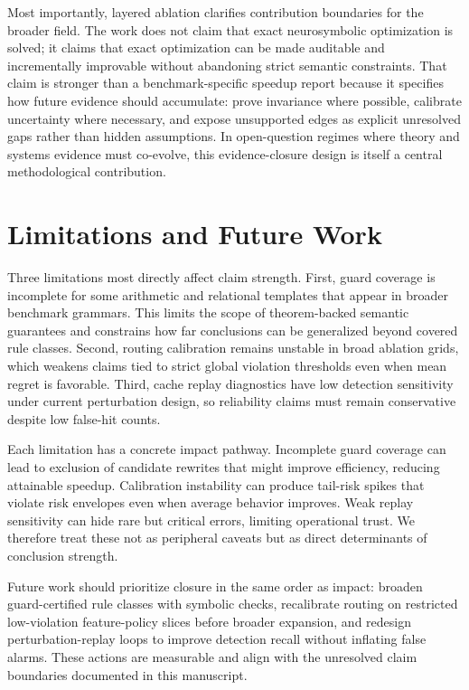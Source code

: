 \documentclass{article} %
\begin{document}
Most importantly, layered ablation clarifies contribution boundaries for the broader field. The work does not claim that exact neurosymbolic optimization is solved; it claims that exact optimization can be made auditable and incrementally improvable without abandoning strict semantic constraints. That claim is stronger than a benchmark-specific speedup report because it specifies how future evidence should accumulate: prove invariance where possible, calibrate uncertainty where necessary, and expose unsupported edges as explicit unresolved gaps rather than hidden assumptions. In open-question regimes where theory and systems evidence must co-evolve, this evidence-closure design is itself a central methodological contribution.

\section{Limitations and Future Work}
\label{sec:limitations}
Three limitations most directly affect claim strength. First, guard coverage is incomplete for some arithmetic and relational templates that appear in broader benchmark grammars. This limits the scope of theorem-backed semantic guarantees and constrains how far conclusions can be generalized beyond covered rule classes. Second, routing calibration remains unstable in broad ablation grids, which weakens claims tied to strict global violation thresholds even when mean regret is favorable. Third, cache replay diagnostics have low detection sensitivity under current perturbation design, so reliability claims must remain conservative despite low false-hit counts.

Each limitation has a concrete impact pathway. Incomplete guard coverage can lead to exclusion of candidate rewrites that might improve efficiency, reducing attainable speedup. Calibration instability can produce tail-risk spikes that violate risk envelopes even when average behavior improves. Weak replay sensitivity can hide rare but critical errors, limiting operational trust. We therefore treat these not as peripheral caveats but as direct determinants of conclusion strength.

Future work should prioritize closure in the same order as impact: broaden guard-certified rule classes with symbolic checks, recalibrate routing on restricted low-violation feature-policy slices before broader expansion, and redesign perturbation-replay loops to improve detection recall without inflating false alarms. These actions are measurable and align with the unresolved claim boundaries documented in this manuscript.
\end{document}
